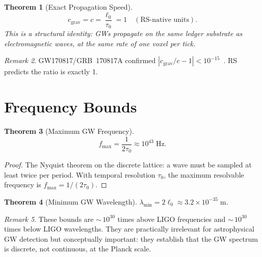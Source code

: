 \documentclass[12pt,a4paper]{article}
\newtheorem{theorem}{Theorem}[section]
\theoremstyle{definition}
\theoremstyle{remark}
\newtheorem{remark}[theorem]{Remark}
\begin{document}
\begin{theorem}[Exact Propagation Speed]
\label{thm:speed}
\begin{equation}
  \boxed{c_{\mathrm{grav}} = c = \frac{\ell_0}{\tau_0} = 1
  \quad (\text{RS-native units}).}
\end{equation}
This is a structural identity: GWs propagate on the same ledger
substrate as electromagnetic waves, at the same rate of one voxel
per tick.
\end{theorem}

\begin{remark}
GW170817/GRB~170817A confirmed $|c_{\mathrm{grav}}/c - 1| <
10^{-15}$~\cite{GW170817}.  RS predicts the ratio is exactly 1.
\end{remark}

\section{Frequency Bounds}
\label{sec:bounds}

\begin{theorem}[Maximum GW Frequency]
\label{thm:fmax}
\begin{equation}
  f_{\max} = \frac{1}{2\tau_0} \approx 10^{43}\;\mathrm{Hz}.
\end{equation}
\end{theorem}

\begin{proof}
The Nyquist theorem on the discrete lattice: a wave must be sampled
at least twice per period.  With temporal resolution $\tau_0$, the
maximum resolvable frequency is $f_{\max} = 1/(2\tau_0)$.
\end{proof}

\begin{theorem}[Minimum GW Wavelength]
\label{thm:lmin}
$\lambda_{\min} = 2\ell_0 \approx 3.2 \times 10^{-35}\;\mathrm{m}$.
\end{theorem}

\begin{remark}
These bounds are ${\sim}\,10^{30}$ times above LIGO frequencies and
${\sim}\,10^{30}$ times below LIGO wavelengths.  They are
practically irrelevant for astrophysical GW detection but
conceptually important: they establish that the GW spectrum is
discrete, not continuous, at the Planck scale.
\end{remark}

\end{document}
